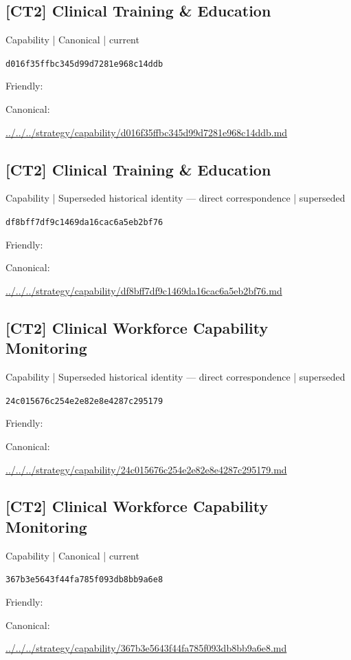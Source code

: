 \documentclass[10pt,a4paper]{article}
\begin{document}
\subsection*{[CT2] Clinical Training \& Education}
{\small Capability | Canonical | current}\par
\texttt{d016f35ffbc345d99d7281e968c14ddb}\par
Friendly: \par
Canonical: \par
{\footnotesize\url{../../../strategy/capability/d016f35ffbc345d99d7281e968c14ddb.md}}\par
\subsection*{[CT2] Clinical Training \& Education}
{\small Capability | Superseded historical identity — direct correspondence | superseded}\par
\texttt{df8bff7df9c1469da16cac6a5eb2bf76}\par
Friendly: \par
Canonical: \par
{\footnotesize\url{../../../strategy/capability/df8bff7df9c1469da16cac6a5eb2bf76.md}}\par
\subsection*{[CT2] Clinical Workforce Capability Monitoring}
{\small Capability | Superseded historical identity — direct correspondence | superseded}\par
\texttt{24c015676c254e2e82e8e4287c295179}\par
Friendly: \par
Canonical: \par
{\footnotesize\url{../../../strategy/capability/24c015676c254e2e82e8e4287c295179.md}}\par
\subsection*{[CT2] Clinical Workforce Capability Monitoring}
{\small Capability | Canonical | current}\par
\texttt{367b3e5643f44fa785f093db8bb9a6e8}\par
Friendly: \par
Canonical: \par
{\footnotesize\url{../../../strategy/capability/367b3e5643f44fa785f093db8bb9a6e8.md}}\par
\end{document}

